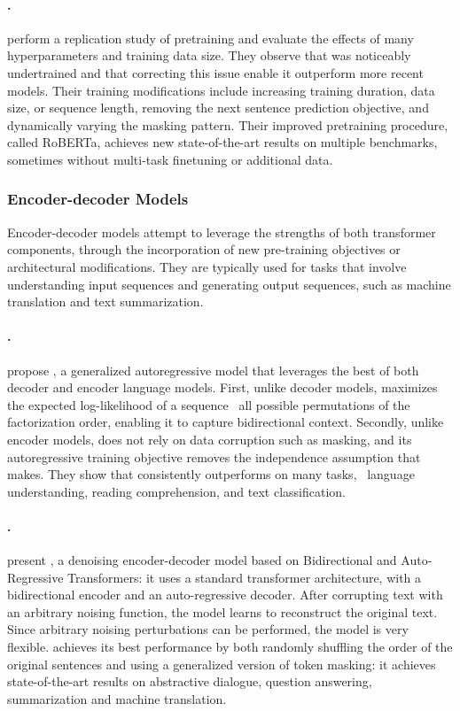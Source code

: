 \paragraph{\roberta.}
\citet{liu2019roberta} perform a replication study of {\bert} pretraining and evaluate the effects of many hyperparameters and training data size. They observe that {\bert} was noticeably undertrained and that correcting this issue enable it outperform more recent models. Their training modifications include increasing training duration, data size, or sequence length, removing the next sentence prediction objective, and dynamically varying the masking pattern. Their improved pretraining procedure, called RoBERTa, achieves new state-of-the-art results on multiple benchmarks, sometimes without multi-task finetuning or additional data.

\subsubsection{Encoder-decoder Models}

Encoder-decoder models attempt to leverage the strengths of both transformer components, through the incorporation of new pre-training objectives or architectural modifications. They are typically used for {\nlp} tasks that involve understanding input sequences and generating output sequences, such as machine translation and text summarization.

\paragraph{\xlnet.}
\citet{yang2019xlnet} propose {\xlnet}, a generalized autoregressive model that leverages the best of both decoder and encoder language models. First, unlike decoder models, {\xlnet} maximizes the expected log-likelihood of a sequence {\wrt}\ all possible permutations of the factorization order, enabling it to capture bidirectional context. Secondly, unlike encoder models, {\xlnet} does not rely on data corruption such as masking, and its autoregressive training objective removes the independence assumption that {\bert} makes. They show that {\xlnet} consistently outperforms {\bert} on many tasks, {\eg}\ language understanding, reading comprehension, and text classification.

\paragraph{\bart.}
\citet{lewis2019bart} present {\bart}, a denoising encoder-decoder model based on Bidirectional and Auto-Regressive Transformers: it uses a standard transformer architecture, with a bidirectional encoder and an auto-regressive decoder. After corrupting text with an arbitrary noising function, the model learns to reconstruct the original text. Since arbitrary noising perturbations can be performed, the model is very flexible. {\bart} achieves its best performance by both randomly shuffling the order of the original sentences and using a generalized version of token masking: it achieves state-of-the-art results on abstractive dialogue, question answering, summarization and machine translation.

